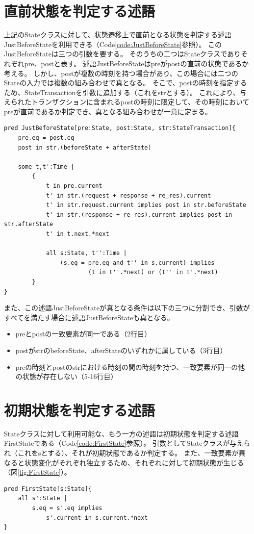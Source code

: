 \documentclass[12pt,a4paper]{jbook}
\begin{document}
\section{直前状態を判定する述語}
上記のStateクラスに対して、状態遷移上で直前となる状態を判定する述語JustBeforeStateを利用できる（Code\ref{code:JustBeforeState}参照）。
このJustBeforeStateは三つの引数を要する。
そのうちの二つはStateクラスでありそれぞれpre、postと表す。
述語JustBeforeStateはpreがpostの直前の状態であるか考える。
しかし、postが複数の時刻を持つ場合があり、この場合には二つのStateの入力では複数の組み合わせで真となる。
そこで、postの時刻を指定するため、StateTransactionを引数に追加する（これをstrとする）。
これにより、与えられたトランザクションに含まれるpostの時刻に限定して、その時刻においてpreが直前であるか判定でき、真となる組み合わせが一意に定まる。
\begin{lstlisting}[caption=状態遷移において直前の状態を判定する述語, label=code:JustBeforeState]
pred JustBeforeState[pre:State, post:State, str:StateTransaction]{
	pre.eq = post.eq
	post in str.(beforeState + afterState)

	some t,t':Time |
		{
			t in pre.current
			t' in str.(request + response + re_res).current
			t' in str.request.current implies post in str.beforeState
			t' in str.(response + re_res).current implies post in str.afterState
			t' in t.next.*next

			all s:State, t'':Time |
				(s.eq = pre.eq and t'' in s.current) implies
						(t in t''.*next) or (t'' in t'.*next)
		}
}
\end{lstlisting}

また、この述語JustBeforeStateが真となる条件は以下の三つに分割でき、引数がすべてを満たす場合に述語JustBeforeStateも真となる。
\begin{itemize}
\item preとpostの一致要素が同一である（2行目）
\item postがstrのbeforeState、afterStateのいずれかに属している（3行目）
\item preの時刻とpostのstrにおける時刻の間の時刻を持つ、一致要素が同一の他の状態が存在しない（5-16行目）
\end{itemize}

\section{初期状態を判定する述語}
Stateクラスに対して利用可能な、もう一方の述語は初期状態を判定する述語FirstStateである（Code\ref{code:FirstState}参照）。
引数としてStateクラスが与えられ（これをsとする）、それが初期状態であるか判定する。
また、一致要素が異なると状態変化がそれぞれ独立するため、それぞれに対して初期状態が生じる（図\ref{fig:FirstState}）。
\begin{lstlisting}[caption=状態遷移において初期状態を判定する述語, label=code:FirstState]
pred FirstState[s:State]{
	all s':State |
		s.eq = s'.eq implies
			s'.current in s.current.*next
}
\end{lstlisting}
\end{document}
